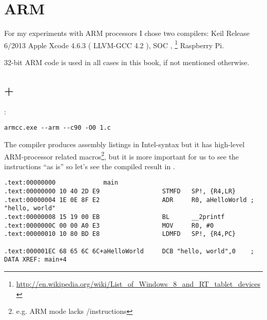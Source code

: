 \section{ARM}
\label{sec:hw_ARM}

\index{\idevices}
{For my experiments with ARM processors I chose two compilers}: 
 Keil Release 6/2013 
 Apple Xcode 4.6.3  ( LLVM-GCC 4.2 ), 
 \ac{SOC} \InENRU \idevices, 
\footnote{\url{http://en.wikipedia.org/wiki/List_of_Windows_8_and_RT_tablet_devices}} 
 Raspberry Pi.

{32-bit ARM code is used in all cases in this book, if not mentioned otherwise}.

\subsection{\NonOptimizingKeil + \ARMMode}

:

\begin{lstlisting}
armcc.exe --arm --c90 -O0 1.c 
\end{lstlisting}

\index{\IntelSyntax}
{The  compiler produces assembly listings in Intel-syntax} 
{but it has high-level ARM-processor related macros}\footnote{
{e.g. ARM mode lacks \PUSH/\POP instructions}}, 
{but it is more important for us to see the instructions ``as is'' so let's see the compiled result in \IDA}.

\begin{lstlisting}[caption=\NonOptimizingKeil + \ARMMode + \IDA]
.text:00000000             main
.text:00000000 10 40 2D E9                 STMFD   SP!, {R4,LR}
.text:00000004 1E 0E 8F E2                 ADR     R0, aHelloWorld ; "hello, world"
.text:00000008 15 19 00 EB                 BL      __2printf
.text:0000000C 00 00 A0 E3                 MOV     R0, #0
.text:00000010 10 80 BD E8                 LDMFD   SP!, {R4,PC}

.text:000001EC 68 65 6C 6C+aHelloWorld     DCB "hello, world",0    ; DATA XREF: main+4
\end{lstlisting}

